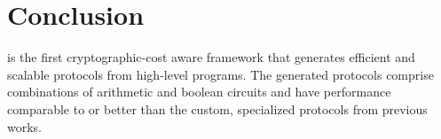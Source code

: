 \section{Conclusion}
\label{sec:conclude}
\tool is the first
cryptographic-cost aware framework that generates efficient and
scalable \mpc protocols from high-level programs.
The generated protocols comprise combinations
of arithmetic and boolean circuits and have performance comparable to
or better than the custom, specialized
protocols from previous works.